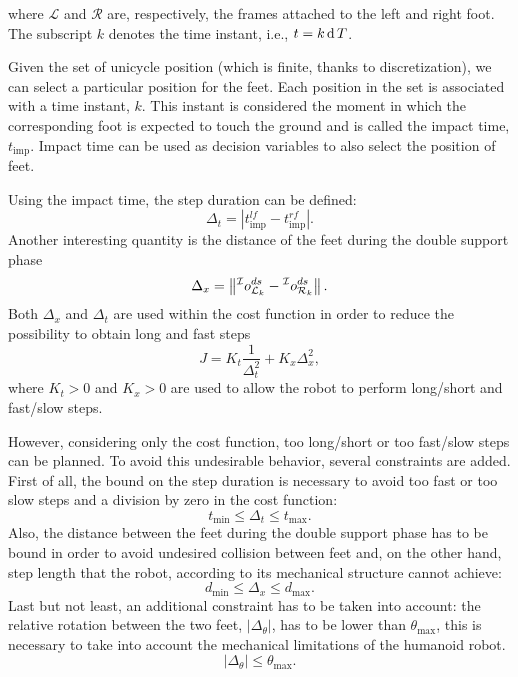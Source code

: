 where $\mathcal{L}$ and $\mathcal{R}$ are, respectively, the frames attached to the left and right foot. The subscript $k$ denotes the time instant, i.e., $t = k \operatorname{d} T$.
\par
Given the set of unicycle position (which is finite, thanks to discretization), we can select a particular position for the feet.
Each position in the set is associated with a time instant, $k$. This instant is considered the moment in which the corresponding foot is expected to touch the ground and is called the impact time, $t_{\text{imp}}$. Impact time can be used as decision variables to also select the position of feet.
\par
Using the impact time, the step duration can be defined:
\begin{equation}
    \Delta_t = |t^{lf}_{\text{imp}} - t^{rf}_{\text{imp}}|.
\end{equation}
Another interesting quantity is the distance of the feet during the double support phase
\begin{equation}
\Delta_x = \left\lVert\prescript{\mathcal{I}}{}{{o}}^{ds}_{\mathcal{L}_k} - \prescript{\mathcal{I}}{}{{o}}^{ds}_{\mathcal{R}_k}\right\rVert.
\end{equation}
Both $\Delta_x$ and $\Delta_t$ are used within the cost function in order to reduce the possibility
to obtain long and fast steps
\begin{equation}
J = K_t \frac{1}{\Delta_t^2}  +  K_x \Delta_x^2,
\end{equation}
where $K_t>0$ and $K_x>0$ are used to allow the robot to perform long/short and fast/slow steps.
\par
However, considering only the cost function, too long/short or too fast/slow steps can be planned. To avoid this undesirable behavior, several constraints are added.
First of all, the bound on the step duration is necessary to avoid too fast or too slow steps and a division by zero in the cost function:
\begin{equation}
t_{\text{min}} \leq \Delta_t \leq t_{\text{max}}.
\end{equation}
Also, the distance between the feet during the double support phase has to be bound in order to
avoid undesired collision between feet and, on the other hand, step length that the robot, according to its mechanical structure cannot achieve:
\begin{equation}
d_{\text{min}} \le \Delta_x \leq d_{\text{max}}.
\end{equation}
Last but not least, an additional constraint has to be taken into account: the relative rotation
between the two feet, $|\Delta_\theta|$, has to be lower than $\theta_{\text{max}}$,
this is necessary to take into account the mechanical limitations of the humanoid robot.
\begin{equation}
|\Delta_\theta| \leq  \theta_{\text{max}}.
\end{equation}
\par

